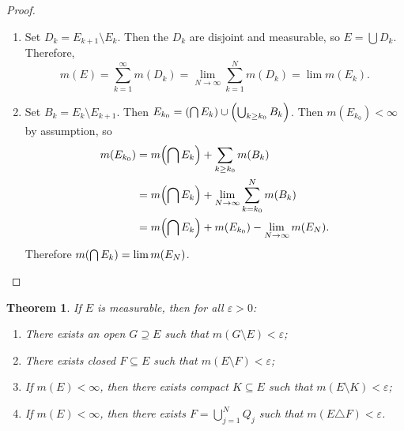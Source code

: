 \documentclass[leqno, openany]{memoir}
\newtheorem{thm}{Theorem}[chapter]
\theoremstyle{definition}
\theoremstyle{remark}
\theoremstyle{plain}
\theoremstyle{definition}
\theoremstyle{remark}
\newcommand{\ep}{\varepsilon}
\begin{document}
\begin{proof} \begin{enumerate} \item Set $D_k = E_{k+1} \setminus E_k$. Then
    the $D_k$ are disjoint and measurable, so $E = \bigcup D_k$. Therefore, \[
    m(E) = \sum_{k=1}^{\infty} m(D_k) = \lim_{N \to \infty} \sum_{k=1}^N m(D_k)
= \lim m(E_k). \] \item Set $B_k = E_k \setminus E_{k+1}$. Then $E_{k_0} =
\qty(\bigcap E_k) \cup \qty(\bigcup_{k\geq k_0} B_k)$. Then $m(E_{k_0}) <
\infty$ by assumption, so \begin{align*} m(E_{k_0}) &= m\qty(\bigcap E_k) +
    \sum_{k \geq k_0} m(B_k) \\ &= m\qty(\bigcap E_k) + \lim_{N \to \infty}
    \sum_{k=k_0}^{N} m(B_k) \\ &= m\qty(\bigcap E_k) + m(E_{k_0}) - \lim_{N \to
    \infty} m (E_N).  \end{align*} Therefore $m\qty(\bigcap E_k) = \lim
    m(E_N)$.  \end{enumerate} \end{proof}

\begin{thm} If $E$ is measurable, then for all $\ep > 0$: \begin{enumerate}
    \item There exists an open $G \supseteq E$ such that $m(G \setminus E) <
        \ep$; \item There exists closed $F \subseteq E$ such that $m(E
        \setminus F) < \ep$; \item If $m(E) < \infty$, then there exists
        compact $K \subseteq E$ such that $m(E \setminus K) < \ep$; \item If
$m(E) < \infty$, then there exists $F = \bigcup_{j=1}^N Q_j$ such that $m(E
\triangle F) < \ep$.  \end{enumerate} \end{thm}
\end{document}
